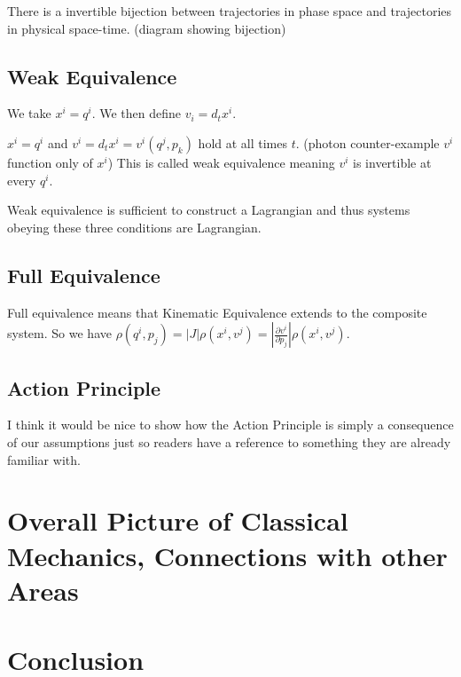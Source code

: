 \documentclass{article}
\begin{document}
\begin{assump}
	There is a invertible bijection between trajectories in phase space and trajectories in physical space-time. (diagram showing bijection)
\end{assump}

\subsection{Weak Equivalence}

\begin{defn}
	We take $x^i = q^i$. We then define $v_i = d_tx^i$.
\end{defn}

\begin{prop}
	$x^i = q^i$ and $v^i = d_tx^i = v^i(q^j,p_k)$ hold at all times $t$. (photon counter-example $v^i$ function only of $x^i$) This is called weak equivalence meaning $v^i$ is invertible at every $q^i$. 
\end{prop}

\begin{prop}
	Weak equivalence is sufficient to construct a Lagrangian and thus systems obeying these three conditions are Lagrangian.
\end{prop}

\subsection{Full Equivalence}

\begin{defn}
	Full equivalence means that Kinematic Equivalence extends to the composite system. So we have $\rho(q^i,p_j) = \left|J\right|\rho(x^i,v^j) = \left|\frac{\partial v^i}{\partial p_j}\right|\rho(x^i,v^j)$. 
\end{defn}	

\subsection{Action Principle}

I think it would be nice to show how the Action Principle is simply a consequence of our assumptions just so readers have a reference to something they are already familiar with.

\section{Overall Picture of Classical Mechanics, Connections with other Areas} 


\section{Conclusion}
	
\end{document}
